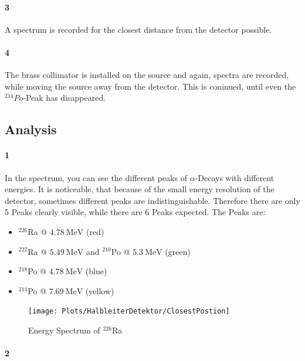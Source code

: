 \documentclass[12pt,twoside,a4paper]{scrartcl}
\begin{document}
		\paragraph{3}
			A spectrum is recorded for the closest distance from the detector possible.

		\paragraph{4}
			The brass collimator is installed on the source and again, spectra are recorded, while moving the source away from the detector. This is coninued, until even the $^{214}Po$-Peak has disappeared.

	\subsection{Analysis}

		\paragraph{1}

			In the spectrum, you can see the different peaks of $\alpha$-Decays with different energies. It is noticeable, that because of the small energy resolution of the detector, sometimes different peaks are indistinguishable. Therefore there are only 5 Peaks clearly visible, while there are 6 Peaks expected.
			The Peaks are:
			\begin{itemize}
				\item $^{226}$Ra @ $\SI{4.78}{\mega \electronvolt}$ (red)
				\item $^{222}$Ra @ $\SI{5.49}{\mega \electronvolt}$ and  $^{210}$Po @ $\SI{5.3}{\mega \electronvolt}$ (green)
				\item $^{218}$Po @ $\SI{4.78}{\mega \electronvolt}$ (blue)
				\item $^{214}$Po @ $\SI{7.69}{\mega \electronvolt}$ (yellow)
			\end{itemize}

			\begin{figure}[H]
				\centering
					\texttt{[image: Plots/HalbleiterDetektor/ClosestPostion]}
				\caption{Energy Spectrum of $ ^{226}$Ra}
				\label{SI::Spectrum}
			\end{figure}

		\paragraph{2}
\end{document}
